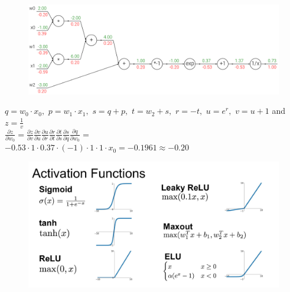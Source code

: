\documentclass[10pt, compress]{beamer}
\begin{document}
\begin{frame}
  \vspace{1cm}
  \begin{figure}
    \includegraphics[width=1\linewidth]{imgs/backprop_2}
  \end{figure}
  $q = w_0 \cdot x_0,$ \quad $p = w_1 \cdot x_1,$ \quad $s = q + p,$ \quad $t = w_2 + s,$ \quad $r = -t,$ \quad $u = e^r,$ \quad $v = u + 1$ and $z = \frac{1}{v}$ \\
  \Large{$\frac{\partial z}{\partial w_0} = \frac{\partial z}{\partial v}\frac{\partial v}{\partial u}\frac{\partial u}{\partial r}\frac{\partial r}{\partial t}\frac{\partial t}{\partial s}\frac{\partial s}{\partial q}\frac{\partial q}{\partial w_0} = $} \\
  \small{$-0.53 \cdot 1 \cdot 0.37 \cdot (-1) \cdot 1 \cdot 1 \cdot  x_0 = -0.1961 \approx -0.20$}
\end{frame}

\begin{frame}
  \vspace{1cm}
  \begin{figure}
    \includegraphics[width=1\linewidth]{imgs/activation_functions}
  \end{figure}
\end{frame}
\end{document}
